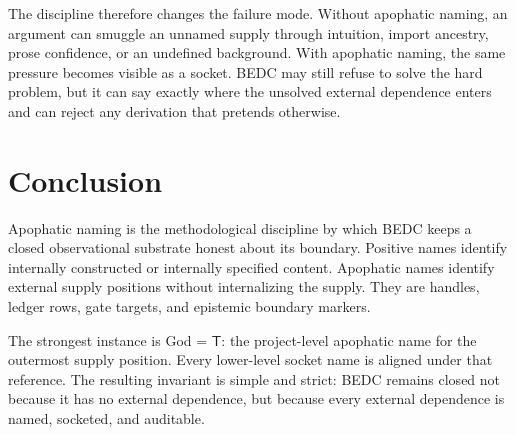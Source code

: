 The discipline therefore changes the failure mode. Without apophatic naming, an argument can smuggle an unnamed supply through intuition, import ancestry, prose confidence, or an undefined background. With apophatic naming, the same pressure becomes visible as a socket. BEDC may still refuse to solve the hard problem, but it can say exactly where the unsolved external dependence enters and can reject any derivation that pretends otherwise.

\section{Conclusion}
\label{sec:apophatic-naming-conclusion}

Apophatic naming is the methodological discipline by which BEDC keeps a closed observational substrate honest about its boundary. Positive names identify internally constructed or internally specified content. Apophatic names identify external supply positions without internalizing the supply. They are handles, ledger rows, gate targets, and epistemic boundary markers.

The strongest instance is God = $\mathsf{T}$: the project-level apophatic name for the outermost supply position. Every lower-level socket name is aligned under that reference. The resulting invariant is simple and strict: BEDC remains closed not because it has no external dependence, but because every external dependence is named, socketed, and auditable.

